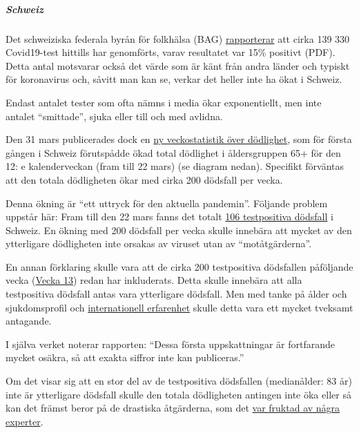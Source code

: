 \hypertarget{schweiz-1}{%
\subparagraph{\texorpdfstring{\textbf{Schweiz}}{Schweiz}}\label{schweiz-1}}

Det schweiziska federala byrån för folkhälsa (BAG)
\href{https://www.bag.admin.ch/bag/de/home/krankheiten/ausbrueche-epidemien-pandemien/aktuelle-ausbrueche-epidemien/novel-cov/situation-schweiz-und-international.html}{rapporterar}
att cirka 139 330 Covid19-test hittills har genomförts, varav resultatet
var 15\% positivt (PDF). Detta antal motsvarar också det värde som är
känt från andra länder och typiskt för koronavirus och, såvitt man kan
se, verkar det heller inte ha ökat i Schweiz.

Endast antalet tester som ofta nämns i media ökar exponentiellt, men
inte antalet ``smittade'', sjuka eller till och med avlidna.

Den 31 mars publicerades dock en
\href{https://www.bfs.admin.ch/bfs/de/home/statistiken/gesundheit/gesundheitszustand/sterblichkeit-todesursachen.html}{ny
veckostatistik över dödlighet}, som för första gången i Schweiz
förutspådde ökad total dödlighet i åldersgruppen 65+ för den 12: e
kalenderveckan (fram till 22 mars) (se diagram nedan). Specifikt
förväntas att den totala dödligheten ökar med cirka 200 dödsfall per
vecka.

Denna ökning är ``ett uttryck för den aktuella pandemin''. Följande
problem uppstår här: Fram till den 22 mars fanns det totalt
\href{https://de.wikipedia.org/wiki/COVID-19-Pandemie_in_der_Schweiz\#Todesf\%C3\%A4lle}{106
testpositiva dödsfall} i Schweiz. En ökning med 200 dödsfall per vecka
skulle innebära att mycket av den ytterligare dödligheten inte orsakas
av viruset utan av ``motåtgärderna''.

En annan förklaring skulle vara att de cirka 200 testpositiva dödsfallen
påföljande vecka
(\href{https://de.wikipedia.org/wiki/COVID-19-Pandemie_in_der_Schweiz\#Todesf\%C3\%A4lle}{Vecka
13}) redan har inkluderats. Detta skulle innebära att alla testpositiva
dödsfall antas vara ytterligare dödsfall. Men med tanke på ålder och
sjukdomsprofil och
\href{https://swprs.org/rki-relativiert-corona-todesfaelle/}{internationell
erfarenhet} skulle detta vara ett mycket tveksamt antagande.

I själva verket noterar rapporten: ``Dessa första uppskattningar är
fortfarande mycket osäkra, så att exakta siffror inte kan publiceras.''

Om det visar sig att en stor del av de testpositiva dödsfallen
(medianålder: 83 år) inte är ytterligare dödsfall skulle den totala
dödligheten antingen inte öka eller så kan det främst beror på de
drastiska åtgärderna, som det
\href{https://swprs.org/offener-brief-von-professor-sucharit-bhakdi-an-bundeskanzlerin-dr-angela-merkel/}{var
fruktad av några experter}.

